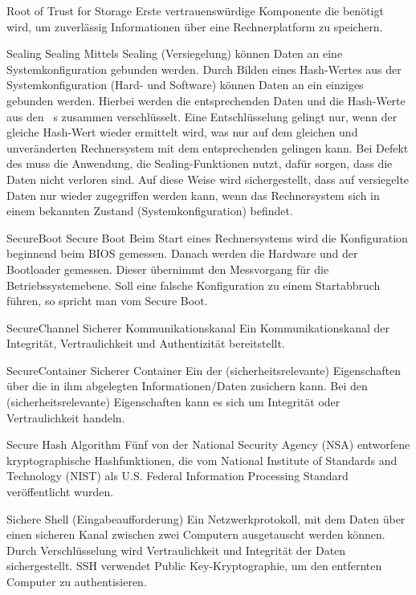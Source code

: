 	{Root of Trust for Storage}
	{Erste vertrauensw\"urdige Komponente die ben\"otigt wird, um 
	zuverl\"assig Informationen \"uber eine Rechnerplatform zu speichern. }

\glosentry
	{Sealing}
	{Sealing}
	{Mittels Sealing (Versiegelung) k\"onnen Daten an eine Systemkonfiguration gebunden 
	 werden. Durch Bilden eines Hash-Wertes aus der Systemkonfiguration
	 (Hard- und Software) k\"onnen Daten an ein einziges \TPM
	 gebunden werden. Hierbei werden die entsprechenden Daten und 
	 die Hash-Werte aus den \PCR~s zusammen verschl\"usselt.
	 Eine Entschl\"usselung gelingt nur, wenn
	 der gleiche Hash-Wert wieder ermittelt wird, was nur auf dem 
	 gleichen und unver\"anderten Rechnersystem mit dem entsprechenden \TPM 
	 gelingen kann. Bei Defekt des \TPM muss die Anwendung, die 
	 Sealing-Funktionen nutzt, daf\"ur sorgen, dass die Daten nicht verloren 
	 sind. Auf diese Weise wird sichergestellt, dass auf versiegelte Daten 
	 nur wieder zugegriffen werden kann, wenn das Rechnersystem sich in 
	 einem bekannten Zustand (Systemkonfiguration) befindet.}

\glosentry
	{SecureBoot}
	{Secure Boot}
	{Beim Start eines Rechnersystems wird die Konfiguration beginnend beim 
	 BIOS gemessen. Danach werden die Hardware und der Bootloader gemessen.
	 Dieser \"ubernimmt den Messvorgang f\"ur die Betriebssystemebene. Soll 
	 eine falsche Konfiguration zu einem Startabbruch f\"uhren, so spricht 
	 man vom Secure Boot.}

\glosentry
	{SecureChannel}
	{Sicherer Kommunikationskanal}
	{Ein Kommunikationskanal der Integrit\"at, Vertraulichkeit und
	 Authentizit\"at bereitstellt.}

\glosentry
	{SecureContainer}
	{Sicherer Container}
	{Ein \Container der (sicherheitsrelevante) Eigenschaften \"uber die in 
	 ihm abgelegten Informationen/Daten zusichern kann. Bei den 
	 (sicherheitsrelevante) Eigenschaften kann es sich um Integrit\"at oder  
          Vertraulichkeit handeln.}


	{Secure Hash Algorithm}
	{F\"unf von der National Security Agency (NSA) entworfene
	 kryptographische Hashfunktionen, die vom National Institute of 
	 Standards and Technology (NIST) als U.S. Federal Information 
	 Processing Standard ver\"offentlicht wurden.}
	 


        {Sichere Shell (Eingabeaufforderung)}
        {Ein Netzwerkprotokoll, mit dem Daten \"uber einen sicheren Kanal
	 zwischen zwei Computern ausgetauscht werden k\"onnen. Durch
         Verschl\"usselung wird Vertraulichkeit und Integrit\"at der Daten
	 sichergestellt. SSH verwendet Public Key-Kryptographie, um den
	 entfernten Computer zu authentisieren.}

